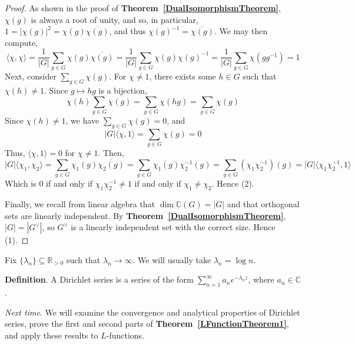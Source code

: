 \documentclass[12pt]{article}
\newcommand{\reals}{\mathbb{R}}
\newcommand{\complex}{\mathbb{C}}
\newcommand{\iprod}[2]{\langle #1, #2 \rangle}
\newcommand{\tref}[1]{\textbf{Theorem~\ref{#1}}}
\numberwithin{equation}{section}
\numberwithin{thm}{section}
\numberwithin{lemma}{section}
\numberwithin{cor}{section}
\begin{document}
\begin{proof}
  As shown in the proof of \tref{DualIsomorphismTheorem}, $\chi(g)$ is always a root of unity, and so, in particular, $1 = |\chi(g)|^2 = \chi(g) \overline{\chi(g)}$, and thus $\chi(g)^{-1} = \overline{\chi(g)}$. We may then compute, \begin{equation*}
    \iprod{\chi}{\chi} = \frac{1}{|G|} \sum_{g \in G} \chi(g) \overline{\chi(g)} = \frac{1}{|G|} \sum_{g \in G} \chi(g) \chi(g)^{-1} = \frac{1}{|G|} \sum_{g \in G} \chi(gg^{-1}) = 1
  \end{equation*} Next, consider $\sum_{g \in G} \chi(g)$. For $\chi \ne 1$, there exists some $h \in G$ such that $\chi(h) \ne 1$. Since $g \mapsto hg$ is a bijection, \begin{equation*}
    \chi(h) \sum_{g \in G} \chi(g) = \sum_{g \in G} \chi(hg) = \sum_{g \in G} \chi(g)
  \end{equation*} Since $\chi(h) \ne 1$, we have $\sum_{g \in G} \chi(g) = 0$, and \begin{equation*}
    |G| \iprod{\chi}{1} = \sum_{g \in G} \chi(g) = 0
  \end{equation*} Thus, $\iprod{\chi}{1} = 0$ for $\chi \ne 1$. Then, \begin{equation*}
    |G| \iprod{\chi_1}{\chi_2} = \sum_{g \in G} \chi_1(g) \overline{\chi_2(g)} = \sum_{g \in G} \chi_1(g) \chi_2^{-1} (g) = \sum_{g \in G} (\chi_1 \chi_2^{-1})(g) = |G| \iprod{\chi_1 \chi_2^{-1}}{1}
  \end{equation*} Which is $0$ if and only if $\chi_1\chi_2^{-1} \ne 1$ if and only if $\chi_1 \ne \chi_2$. Hence (2).

  Finally, we recall from linear algebra that $\dim \complex(G) = |G|$ and that orthogonal sets are linearly independent. By \tref{DualIsomorphismTheorem}, $|G| = |G^{\vee}|$, so $G^{\vee}$ is a linearly independent set with the correct size. Hence (1).
\end{proof}

Fix $\{ \lambda_n \} \subseteq \reals_{> 0}$ such that $\lambda_n \to \infty$. We will usually take $\lambda_n = \log n$. 

\textbf{Definition}. A Dirichlet series is a series of the form $\sum_{n = 1}^{\infty} a_n e^{- \lambda_n z}$, where $a_n \in \complex$.

\textit{Next time}. We will examine the convergence and analytical properties of Dirichlet series, prove the first and second parts of \tref{LFunctionTheorem1}, and apply these results to $L$-functions.
\end{document}

